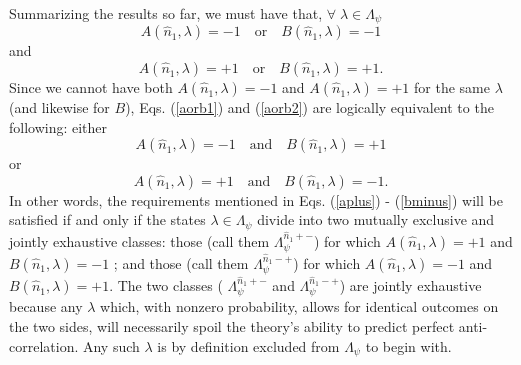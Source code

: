 \documentclass[aps,prc,onecolumn,12pt]{revtex4-2}
\begin{document}
Summarizing the results so far, we must have that,
$\forall \; \lambda \in \Lambda_\psi$
\begin{equation}
A(\hat{n}_1, \lambda) = -1 \quad {\mathrm{or}} \quad
B(\hat{n}_1,\lambda) = -1
\label{aorb1}
\end{equation}
and
\begin{equation}
A(\hat{n}_1,\lambda) = +1 \quad {\mathrm{or}} \quad
B(\hat{n}_1,\lambda) = +1.
\label{aorb2}
\end{equation}
Since we cannot have both $A(\hat{n}_1,\lambda)=-1$ and
$A(\hat{n}_1,\lambda)=+1$ for the same $\lambda$ (and likewise for
$B$), Eqs. (\ref{aorb1}) and (\ref{aorb2}) are logically
equivalent to the following:  either
\begin{equation}
A(\hat{n}_1,\lambda) = -1 \quad {\mathrm{and}} \quad
B(\hat{n}_1,\lambda) = +1
\end{equation}
or
\begin{equation}
A(\hat{n}_1,\lambda) = +1 \quad {\mathrm{and}} \quad
B(\hat{n}_1,\lambda) = -1.
\end{equation}
In other words, the requirements mentioned in Eqs.
(\ref{aplus}) - (\ref{bminus}) will be satisfied if and only if the
states $\lambda \in \Lambda_\psi$ divide into two mutually
exclusive and jointly exhaustive classes:  those (call them
$ \Lambda^{  \hat{n}_1 + - }_\psi $) for which
$A(\hat{n}_1,\lambda) = +1$ and $B(\hat{n}_1,\lambda)=-1$ ;
and those (call them $\Lambda^{\hat{n}_1 - + }_\psi $) for which
$A(\hat{n}_1,\lambda) = -1$ and $B(\hat{n}_1,\lambda)=+1$.
The two classes ( $\Lambda^{\hat{n}_1 + - }_\psi $ and
$\Lambda^{\hat{n}_1 - + }_\psi  $) are jointly exhaustive
because any $\lambda$ which, with nonzero probability, allows for
identical outcomes on the two sides, will necessarily spoil the
theory's ability to predict perfect anti-correlation.  Any such
$\lambda$ is by definition excluded from $\Lambda_\psi$ to begin
with.
\end{document}

